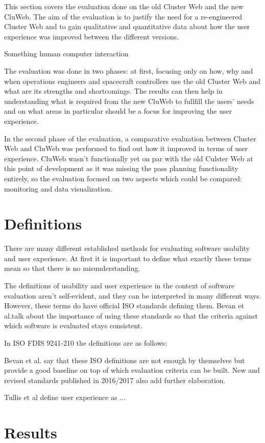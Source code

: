 
This section covers the evaluation done on the old Cluster Web and the new CluWeb. The aim of the evaluation is to justify the need for a re-engineered Cluster Web and to gain qualitative and quantitative data about how the user experience was improved between the different versions.

Something human computer interaction \cite{4839639}

The evaluation was done in two phases: at first, focusing only on how, why and when operations engineers and spacecraft controllers use the old Cluster Web and what are its strengths and shortcomings. The results can then help in understanding what is required from the new CluWeb to fullfill the users' needs and on what areas in particular should be a focus for improving the user experience.

In the second phase of the evaluation, a comparative evaluation between Cluster Web and CluWeb was performed to find out how it improved in terms of user experience. CluWeb wasn't functionally yet on par with the old Culster Web at this point of development as it was missing the pass planning functionality entirely, so the evaluation focused on two aspects which could be compared: monitoring and data visualization.

\section{Definitions}

There are many different established methods for evaluating software usability and user experience. At first it is important to define what exactly these terms mean so that there is no misunderstanding.

The definitions of usability and user experience in the context of software evaluation aren't self-evident, and they can be interpreted in many different ways. However, these terms do have official ISO standards defining them. Bevan et al.talk about the importance of using these standards so that the criteria against which software is evaluated stays consistent.

In  ISO FDIS 9241-210 the definitions are as follows:


Bevan et al. say that these ISO definitions are not enough by themselves but provide a good baseline on top of which evaluation criteria can be built. New and revised standards published in 2016/2017 also add further elaboration.

\cite{bevan2009difference, bevaniso, bevanevaluation, bevanstandard}

Tullis et al define user experience as ...\cite{albert2013measuring}


\cite{nielsen1995usability, hollingsed2007usability, holzinger2005usability, rubin2008handbook, dumas1999practical, vermeeren2010user, bevan2009difference, vaananen2008towards, laugwitz2008construction, obrist2009user, battleson2001usability, van2003retrospective, hassenzahl2010needs, albert2013measuring}

\section{Results}